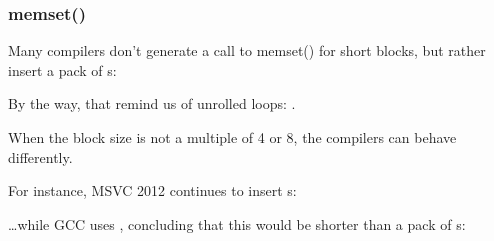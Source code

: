 ﻿\subsubsection{memset()}




Many compilers don't generate a call to memset() for short blocks, but rather insert a pack of \MOV{}s:




By the way, that remind us of unrolled loops: 
.




When the block size is not a multiple of 4 or 8, the compilers can behave differently.


For instance, MSVC 2012 continues to insert s:




\dots while GCC uses , concluding that this would be shorter than a pack of s:



